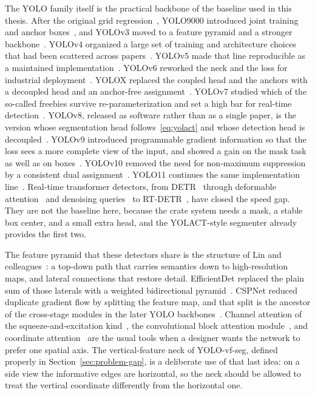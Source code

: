 The YOLO family itself is the practical backbone of the baseline used in this thesis. After the original grid regression~\cite{redmon2016yolo}, YOLO9000 introduced joint training and anchor boxes~\cite{redmon2017yolo9000}, and YOLOv3 moved to a feature pyramid and a stronger backbone~\cite{redmon2018yolov3}. YOLOv4 organized a large set of training and architecture choices that had been scattered across papers~\cite{bochkovskiy2020yolov4}. YOLOv5 made that line reproducible as a maintained implementation~\cite{jocher2020yolov5}. YOLOv6 reworked the neck and the loss for industrial deployment~\cite{li2022yolov6}. YOLOX replaced the coupled head and the anchors with a decoupled head and an anchor-free assignment~\cite{ge2021yolox}. YOLOv7 studied which of the so-called freebies survive re-parameterization and set a high bar for real-time detection~\cite{wang2023yolov7}. YOLOv8, released as software rather than as a single paper, is the version whose segmentation head follows~\eqref{eq:yolact} and whose detection head is decoupled~\cite{jocher2023yolov8}. YOLOv9 introduced programmable gradient information so that the loss sees a more complete view of the input, and showed a gain on the mask task as well as on boxes~\cite{wang2024yolov9}. YOLOv10 removed the need for non-maximum suppression by a consistent dual assignment~\cite{wang2024yolov10}. YOLO11 continues the same implementation line~\cite{jocher2024yolo11}. Real-time transformer detectors, from DETR~\cite{carion2020detr} through deformable attention~\cite{zhu2021deformable} and denoising queries~\cite{zhang2023dino} to RT-DETR~\cite{zhao2024rtdetr}, have closed the speed gap. They are not the baseline here, because the crate system needs a mask, a stable box center, and a small extra head, and the YOLACT-style segmenter already provides the first two.

The feature pyramid that these detectors share is the structure of Lin and colleagues~\cite{lin2017fpn}: a top-down path that carries semantics down to high-resolution maps, and lateral connections that restore detail. EfficientDet replaced the plain sum of those laterals with a weighted bidirectional pyramid~\cite{tan2020efficientdet}. CSPNet reduced duplicate gradient flow by splitting the feature map, and that split is the ancestor of the cross-stage modules in the later YOLO backbones~\cite{wang2020cspnet}. Channel attention of the squeeze-and-excitation kind~\cite{hu2018senet}, the convolutional block attention module~\cite{woo2018cbam}, and coordinate attention~\cite{hou2021coordatt} are the usual tools when a designer wants the network to prefer one spatial axis. The vertical-feature neck of YOLO-vf-seg, defined properly in Section~\ref{sec:problem-gap}, is a deliberate use of that last idea: on a side view the informative edges are horizontal, so the neck should be allowed to treat the vertical coordinate differently from the horizontal one.

